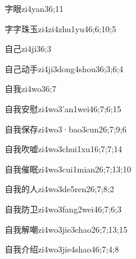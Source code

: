 \begin{verbete}{字眼}{zi4yan3}{6;11}
\end{verbete}
\begin{verbete}{字字珠玉}{zi4zi4zhu1yu4}{6;6;10;5}
\end{verbete}
\begin{verbete}{自己}{zi4ji3}{6;3}
\end{verbete}
\begin{verbete}{自己动手}{zi4ji3dong4shou3}{6;3;6;4}
\end{verbete}
\begin{verbete}{自我}{zi4wo3}{6;7}
\end{verbete}
\begin{verbete}{自我安慰}{zi4wo3'an1wei4}{6;7;6;15}
\end{verbete}
\begin{verbete}{自我保存}{zi4wo3·bao3cun2}{6;7;9;6}
\end{verbete}
\begin{verbete}{自我吹嘘}{zi4wo3chui1xu1}{6;7;7;14}
\end{verbete}
\begin{verbete}{自我催眠}{zi4wo3cui1mian2}{6;7;13;10}
\end{verbete}
\begin{verbete}{自我的人}{zi4wo3de5ren2}{6;7;8;2}
\end{verbete}
\begin{verbete}{自我防卫}{zi4wo3fang2wei4}{6;7;6;3}
\end{verbete}
\begin{verbete}{自我解嘲}{zi4wo3jie3chao2}{6;7;13;15}
\end{verbete}
\begin{verbete}{自我介绍}{zi4wo3jie4shao4}{6;7;4;8}
\end{verbete}
